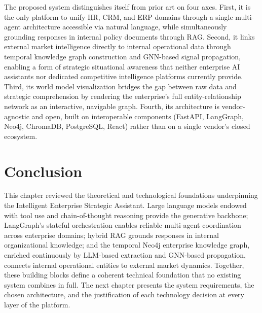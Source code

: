The proposed system distinguishes itself from prior art on four axes.
First, it is the only platform to unify HR, CRM, and ERP domains through
a single multi-agent architecture accessible via natural language, while
simultaneously grounding responses in internal policy documents through RAG.
Second, it links external market intelligence directly to internal operational
data through temporal knowledge graph construction and GNN-based signal
propagation, enabling a form of strategic situational awareness that neither
enterprise AI assistants nor dedicated competitive intelligence platforms
currently provide. Third, its world model visualization bridges the gap
between raw data and strategic comprehension by rendering the enterprise's
full entity-relationship network as an interactive, navigable graph.
Fourth, its architecture is vendor-agnostic and open, built on interoperable
components (FastAPI, LangGraph, Neo4j, ChromaDB, PostgreSQL, React) rather
than on a single vendor's closed ecosystem.

\section{Conclusion}

This chapter reviewed the theoretical and technological foundations underpinning
the Intelligent Enterprise Strategic Assistant. Large language models endowed
with tool use and chain-of-thought reasoning provide the generative backbone;
LangGraph's stateful orchestration enables reliable multi-agent coordination
across enterprise domains; hybrid RAG grounds responses in internal
organizational knowledge; and the temporal Neo4j enterprise knowledge graph,
enriched continuously by LLM-based extraction and GNN-based propagation,
connects internal operational entities to external market dynamics. Together,
these building blocks define a coherent technical foundation that no existing
system combines in full. The next chapter presents the system requirements,
the chosen architecture, and the justification of each technology decision
at every layer of the platform.
